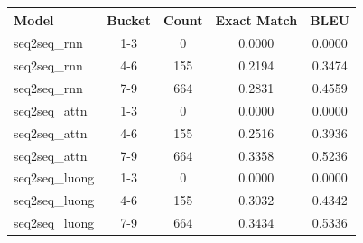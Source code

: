 \begin{tabular}{lcccc}
\toprule
Model & Bucket & Count & Exact Match & BLEU \\
\midrule
seq2seq_rnn & 1-3 & 0 & 0.0000 & 0.0000 \\
seq2seq_rnn & 4-6 & 155 & 0.2194 & 0.3474 \\
seq2seq_rnn & 7-9 & 664 & 0.2831 & 0.4559 \\
seq2seq_attn & 1-3 & 0 & 0.0000 & 0.0000 \\
seq2seq_attn & 4-6 & 155 & 0.2516 & 0.3936 \\
seq2seq_attn & 7-9 & 664 & 0.3358 & 0.5236 \\
seq2seq_luong & 1-3 & 0 & 0.0000 & 0.0000 \\
seq2seq_luong & 4-6 & 155 & 0.3032 & 0.4342 \\
seq2seq_luong & 7-9 & 664 & 0.3434 & 0.5336 \\
\bottomrule
\end{tabular}
